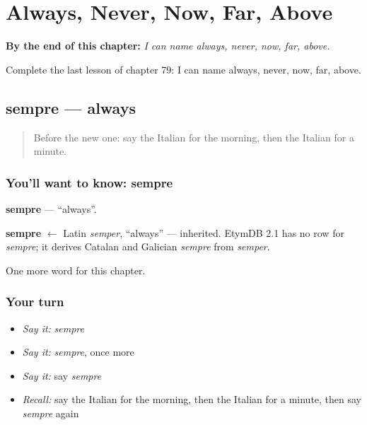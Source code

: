 
\chapter{Always, Never, Now, Far, Above}
\label{ch:it-always-never-now-far-above}

\begin{chapteropening}
\textbf{By the end of this chapter:} \emph{I can name always, never, now, far, above.}

Complete the last lesson of chapter 79: I can name always, never, now, far, above.
\end{chapteropening}

\section[sempre]{sempre — always}

\label{lesson:IT-C79-sempre}



\begin{quote}
Before the new one: say the Italian for the morning, then the Italian for a minute.
\end{quote}

\subsection*{You'll want to know: sempre}
\textbf{sempre} — \textquotedblleft{}always\textquotedblright{}.

\begin{cousinweb}
\textbf{sempre} $\leftarrow$ Latin \emph{semper}, \textquotedblleft{}always\textquotedblright{} — inherited. EtymDB 2.1 has no row for \emph{sempre}; it derives Catalan and Galician \emph{sempre} from \emph{semper}.
\end{cousinweb}

\begin{grammarlens}[title={What you've built}]
One more word for this chapter.
\end{grammarlens}

\subsection*{Your turn}
\begin{itemize}
\raggedright
  \item \emph{Say it:} \emph{sempre}
  \item \emph{Say it:} \emph{sempre}, once more
  \item \emph{Say it:} say \emph{sempre}
  \item \emph{Recall:} say the Italian for the morning, then the Italian for a minute, then say \emph{sempre} again
\end{itemize}

